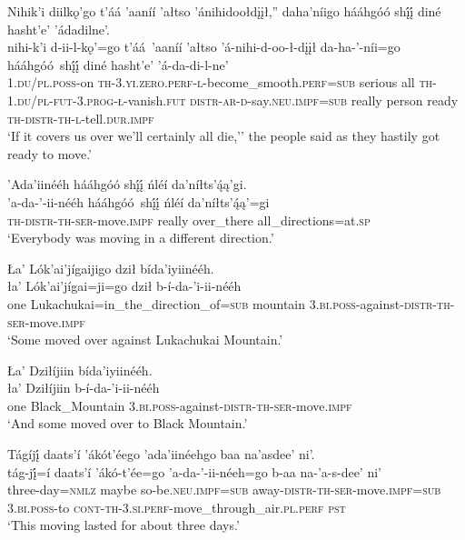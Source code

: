 \ea\label{ex:text6-12-5}
Nihik’i diilkǫ’go t’áá ’aaníí ’ałtso ’ánihidoołdįįł,'' daha’níigo hááhgóó shį́į́ diné hasht’e’ ’ádadilne’.\\
\gll nihi-k’i	d-ii-l-kǫ’=go	t’áá~{’aaníí}	’ałtso	’á-nihi-d-oo-ł-dįįł	da-ha-’-níi=go	hááhgóó~{shį́į́}	diné	hasht’e’	’á-da-di-l-ne’\\
     1.\textsc{du}/\textsc{pl}.\textsc{poss}-on	\textsc{th}-3.\textsc{yi}.\textsc{zero}.\textsc{perf}-\textsc{l}-become\_smooth.\textsc{perf}=\textsc{sub}	serious	all	\textsc{th}-1.\textsc{du}/\textsc{pl}-\textsc{fut}-3.\textsc{prog}-\textsc{ł}-vanish.\textsc{fut}	\textsc{distr}-\textsc{ar}-\textsc{d}-say.\textsc{neu}.\textsc{impf}=\textsc{sub}	really	person	ready	\textsc{th}-\textsc{distr}-\textsc{th}-\textsc{l}-tell.\textsc{dur}.\textsc{impf}\\
\glt `If it covers us over we'll certainly all die,'' the people said as they hastily got ready to move.'
\z

\ea\label{ex:text6-13-1}
’Ada’iinééh hááhgóó shį́į́ ńléí da’níłts’ą́ą’gi.\\
\gll ’a-da-’-ii-nééh	hááhgóó~{shį́į́}	ńléí	da’níłts’ą́ą’=gi\\
     \textsc{th}-\textsc{distr}-\textsc{th}-\textsc{ser}-move.\textsc{impf}	really	over\_there	all\_directions=at.\textsc{sp}\\
\glt `Everybody was moving in a different direction.'
\z

\ea\label{ex:text6-13-2}
Ła’ Lók’ai’jígaijigo dził bída’iyiinééh.\\
\gll ła’	Lók’ai’jígai=ji=go	dził	b-í-da-’i-ii-nééh\\
     one	Lukachukai=in\_the\_direction\_of=\textsc{sub}	mountain	3.\textsc{bi}.\textsc{poss}-against-\textsc{distr}-\textsc{th}-\textsc{ser}-move.\textsc{impf}\\
\glt `Some moved over against Lukachukai Mountain.'
\z

\ea\label{ex:text6-13-3}
Ła’ Dziłíjiin bída’iyiinééh.\\
\gll ła’	Dziłíjiin	b-í-da-’i-ii-nééh\\
     one	Black\_Mountain	3.\textsc{bi}.\textsc{poss}-against-\textsc{distr}-\textsc{th}-\textsc{ser}-move.\textsc{impf}\\
\glt `And some moved over to Black Mountain.'
\z

\ea\label{ex:text6-13-4}
Tágíjį́ daats’í ’ákót’éego ’ada’iinéehgo baa na’asdee’ ni’.\\
\gll tág-jį́=í	daats’í	’ákó-t’ée=go	’a-da-’-ii-néeh=go	b-aa	na-’a-s-dee’	ni’\\
     three-day=\textsc{nmlz}	maybe	so-be.\textsc{neu}.\textsc{impf}=\textsc{sub}	away-\textsc{distr}-\textsc{th}-\textsc{ser}-move.\textsc{impf}=\textsc{sub}	3.\textsc{bi}.\textsc{poss}-to	\textsc{cont}-\textsc{th}-3.\textsc{si}.\textsc{perf}-move\_through\_air.\textsc{pl}.\textsc{perf}	\textsc{pst}\\
\glt `This moving lasted for about three days.'
\z

